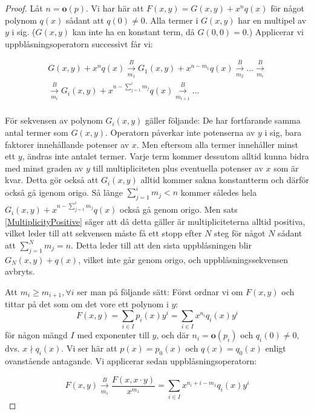 \begin{proof}
Låt $n=\mathbf{o}(p)$. Vi har här att $F(x,y)=G(x,y)+x^nq(x)$ för något polynom $q(x)$ sådant att $q(0)\neq 0$. Alla termer i $G(x,y)$ har en multipel av $y$ i sig. ($G(x,y)$ kan inte ha en konstant term, då $G(0,0)=0$.) Applicerar vi uppblåsningsoperatorn successivt får vi:

\[
\begin{array}{c}
G(x,y)+x^nq(x) \overset{B}{\underset{m_1}{\longrightarrow}} G_1(x,y)+x^{n-m_1}q(x) \overset{B}{\underset{m_2}{\longrightarrow}} \ldots \overset{B}{\underset{m_i}{\longrightarrow}} \\[15pt]
\overset{B}{\underset{m_i}{\longrightarrow}} G_i(x,y)+x^{n-\sum_{j=1}^{i}m_j}q(x) \overset{B}{\underset{m_{i+1}}{\longrightarrow}} \ldots \\
\end{array}
\]

För sekvensen av polynom $G_i(x,y)$ gäller följande: De har fortfarande samma antal termer som $G(x,y)$. Operatorn påverkar inte potenserna av $y$ i sig, bara faktorer innehållande potenser av $x$. Men eftersom alla termer innehåller minst ett $y$, ändras inte antalet termer. Varje term kommer dessutom alltid kunna bidra med minst graden av $y$ till multipliciteten plus eventuella potenser av $x$ som är kvar. Detta gör också att $G_i(x,y)$ alltid kommer sakna konstantterm och därför också gå igenom origo. Så länge $\sum_{j=1}^{i}m_j<n$ kommer således hela $G_i(x,y)+x^{n-\sum_{j=1}^{i}m_j}q(x)$ också gå genom origo. Men sats \ref{MultiplicityPositive} säger att då detta gäller är multipliciteterna alltid positiva, vilket leder till att sekvensen måste få ett stopp efter $N$ steg för något $N$ sådant att $\sum_{j=1}^{N}m_j=n$. Detta leder till att den sista uppblåsningen blir $G_N(x,y)+q(x)$, vilket inte går genom origo, och uppblåsningssekvensen avbryts.

Att $m_i \geq m_{i+1}, \forall i$ ser man på följande sätt: Först ordnar vi om $F(x,y)$ och tittar på det som om det vore ett polynom i $y$:
\[F(x,y) = \sum_{i\in I} p_i(x)y^i = \sum_{i\in I} x^{n_i}q_i(x)y^i\]
för någon mängd $I$ med exponenter till $y$, och där $n_i=\mathbf{o}(p_i)$ och $q_i(0)\neq 0$, dvs. $x \nmid q_i(x)$. Vi ser här att $p(x)=p_0(x)$ och $q(x)=q_0(x)$ enligt ovanstående antagande. Vi applicerar sedan uppblåsnings\-operatorn:

\[F(x,y) \overset{B}{\underset{m_1}{\longrightarrow}} \frac{F(x,x\cdot y)}{x^{m_1}}=\sum_{i\in I} x^{n_i+i-m_1}q_i(x)y^i\]


\end{proof}
